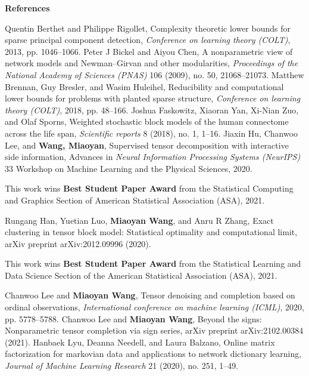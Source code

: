 \documentclass[10pt]{article}
\theoremstyle{plain}
\theoremstyle{definition}
\begin{document}
\newpage
\vspace{1cm}
{\bf \large References}
{ \large 
\begin{thebibliography}{9}
Quentin Berthet and Philippe Rigollet, Complexity theoretic lower bounds for sparse principal component detection, \emph{Conference on learning theory (COLT)}, 2013, pp. 1046–1066.
Peter J Bickel and Aiyou Chen, A nonparametric view of network models and Newman–Girvan and other modularities, \emph{Proceedings of the National Academy of Sciences (PNAS)} 106 (2009), no. 50, 21068–21073.
Matthew Brennan, Guy Bresler, and Wasim Huleihel, Reducibility and computational lower bounds for problems with planted sparse structure, \emph{Conference on learning theory (COLT)}, 2018, pp. 48–166.
Joshua Faskowitz, Xiaoran Yan, Xi-Nian Zuo, and Olaf Sporns, Weighted stochastic block models of the human connectome across the life span, \emph{Scientific reports} 8 (2018), no. 1, 1–16.
Jiaxin Hu, Chanwoo Lee, and {\bf Wang, Miaoyan},  Supervised tensor decomposition with interactive side information, Advances in \emph{Neural Information Processing Systems (NeurIPS)} 33 Workshop on Machine Learning and the Physical Sciences, 2020.

This work wins {\bf Best Student Paper Award} from the Statistical Computing and Graphics Section of American Statistical Association (ASA), 2021.

Rungang Han, Yuetian Luo, {\bf Miaoyan Wang}, and Anru R Zhang, Exact clustering in tensor block model: Statistical optimality and computational limit, arXiv preprint arXiv:2012.09996 (2020). 

This work wins {\bf Best Student Paper Award} from the Statistical Learning and Data Science Section of the American Statistical Association (ASA), 2021.

Chanwoo Lee and {\bf Miaoyan Wang}, Tensor denoising and completion based on ordinal observations, \emph{International conference on machine learning (ICML)}, 2020, pp. 5778–5788.
Chanwoo Lee and {\bf Miaoyan Wang}, Beyond the signs: Nonparametric tensor completion via sign series, arXiv preprint arXiv:2102.00384 (2021).
Hanbaek Lyu, Deanna Needell, and Laura Balzano, Online matrix factorization for markovian data and applications to network
dictionary learning, \emph{Journal of Machine Learning Research} 21 (2020), no. 251, 1–49.


\end{thebibliography}}
\end{document}
